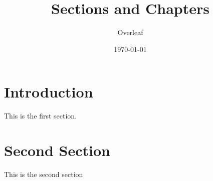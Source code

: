 \documentclass{article}
\title{Sections and Chapters}
\author{Overleaf}
\date{\today}
\begin{document}
\maketitle
\section*{Introduction}

This is the first section.

\blindtext

\section*{Second Section}
This is the second section

\blindtext
\end{document}
